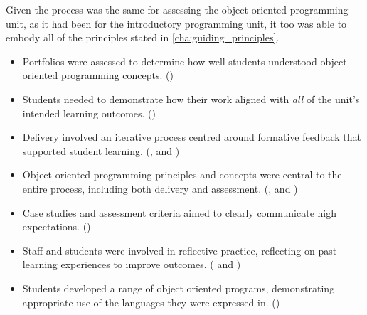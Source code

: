 Given the process was the same for assessing the object oriented programming unit, as it had been for the introductory programming unit, it too was able to embody all of the principles stated in \cref{cha:guiding_principles}.
\begin{itemize}[noitemsep,nolistsep]
	\item Portfolios were assessed to determine how well students understood object oriented programming concepts. ()
	\item Students needed to demonstrate how their work aligned with \emph{all} of the unit's intended learning outcomes. ()
	\item Delivery involved an iterative process centred around formative feedback that supported student learning. (,  and )
	\item Object oriented programming principles and concepts were central to the entire process, including both delivery and assessment. (,  and )
	\item Case studies and assessment criteria aimed to clearly communicate high expectations. ()
	\item Staff and students were involved in reflective practice, reflecting on past learning experiences to improve outcomes.  ( and )
	\item Students developed a range of object oriented programs, demonstrating appropriate use of the languages they were expressed in.  ()
\end{itemize}





